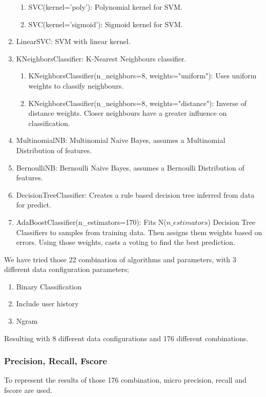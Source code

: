 \documentclass[twoside,11pt]{article}
\begin{document}
\begin{enumerate}
\begin{enumerate}
\item SVC(kernel='poly'): Polynomial kernel for SVM.
\item SVC(kernel='sigmoid'): Sigmoid kernel for SVM.
\end{enumerate}
\item LinearSVC: SVM with linear kernel.
\item KNeighborsClassifier: K-Nearest Neighbours classifier.
\begin{enumerate}
\item KNeighborsClassifier(n\_neighbors=8, weights="uniform"): Uses uniform weights to classify neighbours.
\item KNeighborsClassifier(n\_neighbors=8, weights="distance"): Inverse of distance weights. Closer neighbours have a greater influence on classification.
\end{enumerate}
\item MultinomialNB: Multinomial Naive Bayes, assumes a Multinomial Distribution of features.
\item BernoulliNB: Bernoulli Naive Bayes, assumes a Bernoulli Distribution of features.
\item DecisionTreeClassifier: Creates a rule based decision tree inferred from data for predict.
\item AdaBoostClassifier(n\_estimators=170): Fits N($n\_estimators$) Decision Tree Classifiers to samples from training data. Then assigns them weights based on errors. Using those weights, casts a voting to find the best prediction.
\end{enumerate}
\normalsize
We have tried those 22 combination of algorithms and parameters, with 3 different data configuration parameters; 
\footnotesize
\begin{enumerate}
\item Binary Classification
\item Include user history
\item Ngram
\end{enumerate}
\normalsize

Resulting with 8 different data configurations and 176 different combinations.

\subsubsection{Precision, Recall, Fscore}
To represent the results of those 176 combination, micro precision, recall and fscore are used.
\end{document}
